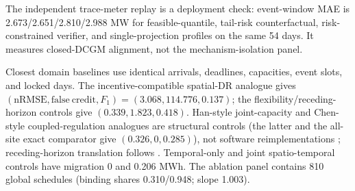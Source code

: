 \documentclass[10pt,journal]{IEEEtran}
\newcommand{\RiskSafe}{risk-constrained verifier}
\newcommand{\TailRisk}{tail-risk counterfactual}
\begin{document}
\begin{table}[t]
\centering
\caption{Locked 54-day mechanism-isolation response results (daily means).}
\label{tab:base}
\footnotesize
{}
\end{table}

The independent trace-meter replay is a deployment check: event-window MAE is
2.673/2.651/2.810/2.988 MW for feasible-quantile, \TailRisk, \RiskSafe, and
single-projection profiles on the same 54 days. It measures closed-DCGM
alignment, not the mechanism-isolation panel.

Closest domain baselines use identical arrivals, deadlines, capacities, event
slots, and locked days. The incentive-compatible spatial-DR analogue gives
$(\mathrm{nRMSE},\mathrm{false\ credit},F_1)=(3.068,114.776,0.137)$; the
flexibility/receding-horizon controls give $(0.339,1.823,0.418)$. Han-style
joint-capacity and Chen-style coupled-regulation analogues are structural
controls (the latter and the all-site exact comparator give $(0.326,0,0.285)$),
not software reimplementations \cite{han2026dispatchable,chen2021idccoupling};
receding-horizon translation follows \cite{zhang2023receding}. Temporal-only
and joint spatio-temporal controls have migration 0 and 0.206 MWh. The ablation
panel contains 810 global schedules (binding shares 0.310/0.948; slope 1.003).
\end{document}
